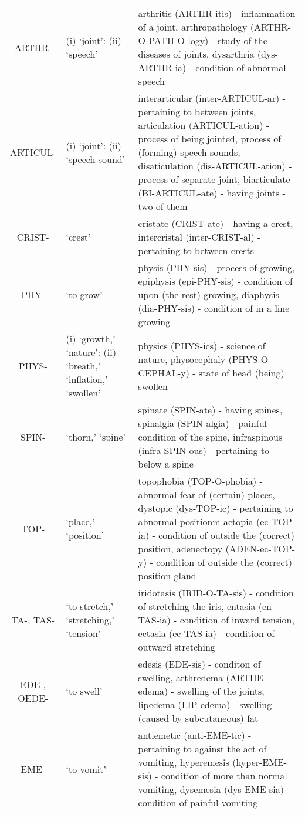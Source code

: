 \begin{longtable}{c | p{} | p{}}
        ARTHR- & (i) `joint': (ii) `speech' & arthritis (ARTHR-itis) - inflammation of a joint, arthropathology (ARTHR-O-PATH-O-logy) - study of the diseases of joints, dysarthria (dys-ARTHR-ia) - condition of abnormal speech \\
        ARTICUL- & (i) `joint': (ii) `speech sound' & interarticular (inter-ARTICUL-ar) - pertaining to between joints, articulation (ARTICUL-ation) - process of being jointed, process of (forming) speech sounds, disaticulation (dis-ARTICUL-ation) - process of separate joint, biarticulate (BI-ARTICUL-ate) - having joints - two of them \\
        CRIST- & `crest' & cristate (CRIST-ate) - having a crest, intercristal (inter-CRIST-al) - pertaining to between crests \\
        PHY- & `to grow' & physis (PHY-sis) - process of growing, epiphysis (epi-PHY-sis) - condition of upon (the rest) growing, diaphysis (dia-PHY-sis) - condition of in a line growing \\
        PHYS- & (i) `growth,' `nature': (ii) `breath,' `inflation,' `swollen' & physics (PHYS-ics) - science of nature, physocephaly (PHYS-O-CEPHAL-y) - state of head (being) swollen \\
        SPIN- & `thorn,' `spine' & spinate (SPIN-ate) - having spines, spinalgia (SPIN-algia) - painful condition of the spine, infraspinous (infra-SPIN-ous) - pertaining to below a spine \\
        TOP- & `place,' `position' & topophobia (TOP-O-phobia) - abnormal fear of (certain) places, dystopic (dys-TOP-ic) - pertaining to abnormal positionm actopia (ec-TOP-ia) - condition of outside the (correct) position, adenectopy (ADEN-ec-TOP-y) - condition of outside the (correct) position gland \\
        TA-, TAS- & `to stretch,' `stretching,' `tension' & iridotasis (IRID-O-TA-sis) - condition of stretching the iris, entasia (en-TAS-ia) - condition of inward tension, ectasia (ec-TAS-ia) - condition of outward stretching \\
        EDE-, OEDE- & `to swell' & edesis (EDE-sis) - conditon of swelling, arthredema (ARTHE-edema) - swelling of the joints, lipedema (LIP-edema) - swelling (caused by subcutaneous) fat \\
        EME- & `to vomit' & antiemetic (anti-EME-tic) - pertaining to against the act of vomiting, hyperemesis (hyper-EME-sis) - condition of more than normal vomiting, dysemesia (dys-EME-sia) - condition of painful vomiting \\

\end{longtable}

